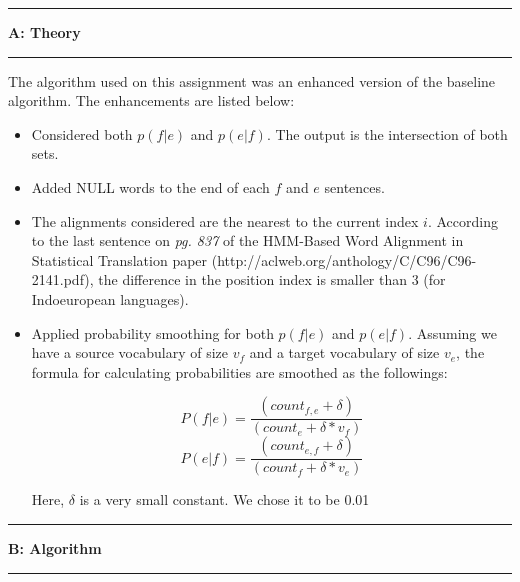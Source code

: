 \documentclass[11pt]{article}
\newcommand\question[2]{\vspace{.25in}\hrule\textbf{#1: #2}\vspace{.5em}\hrule\vspace{.10in}}
\begin{document}
\newcommand\NAME{Turash and Luiz}  %
\newcommand\ID{tmosharr \& lperesde}     %
\newcommand\HWNUM{}              %




\question{A}{Theory} 

The algorithm used on this assignment was an enhanced version of the baseline algorithm. The enhancements are listed below:

\begin{itemize}


\item  Considered both $p(f|e)$ and $p(e|f)$. The output is the intersection of both sets.
\item  Added NULL words to the end of each $f$ and $e$ sentences.
\item  The alignments considered are the nearest to the current index $i$. According to the last sentence on \textit{pg. 837} of the HMM-Based Word Alignment in Statistical Translation paper (http://aclweb.org/anthology/C/C96/C96-2141.pdf), the difference in the position index is smaller than 3 (for Indoeuropean languages). 
\item  Applied probability smoothing for both $p(f|e)$ and $p(e|f)$.
Assuming we have a source vocabulary of size $v_f$ and a target vocabulary of size  $v_e$, the formula for calculating probabilities are smoothed as the followings:

\begin{equation}
P(f|e) = \frac{(count_{f,e} + \delta)}{(count_{e} + \delta * v_f)}
\end{equation} 
\begin{equation}
P(e|f) = \frac{(count_{e,f} + \delta)}{(count_{f} + \delta * v_e)}
\end{equation} 

Here, $\delta$ is a very small constant. We chose it to be 0.01

\end{itemize}
\question{B}{Algorithm} 
\end{document}
